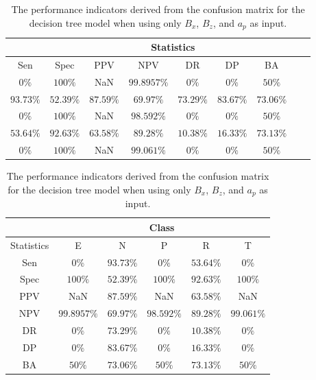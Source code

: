 \begin{table}[!ht]
	\centering
	\begin{tabular}{|c|c|c|c|c|c|c|c|c|}
		\hline
		 & \multicolumn{7}{c|}{Statistics} \\ \hline
		Sen & Spec & PPV & NPV & DR & DP & BA \\ \hline
		$0\%$ & $100\%$ & NaN & $99.8957\%$ & $0\%$ & $0\%$ & $50\%$ \\ \hline
		$93.73\%$ & $52.39\%$ & $87.59\%$ & $69.97\%$ & $73.29\%$ & $83.67\%$ & $73.06\%$ \\ \hline
		$0\%$ & $100\%$ & NaN & $98.592\%$ & $0\%$ & $0\%$ & $50\%$ \\ \hline
		$53.64\%$ & $92.63\%$ & $63.58\%$ & $89.28\%$ & $10.38\%$ & $16.33\%$ & $73.13\%$ \\ \hline
		$0\%$ & $100\%$ & NaN & $99.061\%$ & $0\%$ & $0\%$ & $50\%$ \\ \hline
	\end{tabular}
	\caption{The performance indicators derived from the confusion matrix for the decision tree model when using only $B_{x}$, $B_{z}$, and $a_{p}$ as input.}
	\label{tab:cs:xzap:C5.0}
\end{table}

\begin{table}[!ht]
	\centering
	\begin{tabular}{|c|c|c|c|c|c|}
		\hline
		 & \multicolumn{5}{c|}{Class} \\ \hline
		Statistics & E & N & P & R & T \\ \hline
		Sen & $0\%$ & $93.73\%$ & $0\%$ & $53.64\%$ & $0\%$ \\ \hline
		Spec & $100\%$ & $52.39\%$ & $100\%$ & $92.63\%$ & $100\%$ \\ \hline
		PPV & NaN & $87.59\%$ & NaN & $63.58\%$ & NaN \\ \hline
		NPV & $99.8957\%$ & $69.97\%$ & $98.592\%$ & $89.28\%$ & $99.061\%$ \\ \hline
		DR & $0\%$ & $73.29\%$ & $0\%$ & $10.38\%$ & $0\%$ \\ \hline
		DP & $0\%$ & $83.67\%$ & $0\%$ & $16.33\%$ & $0\%$ \\ \hline
		BA & $50\%$ & $73.06\%$ & $50\%$ & $73.13\%$ & $50\%$ \\ \hline
	\end{tabular}
	\caption{The performance indicators derived from the confusion matrix for the decision tree model when using only $B_{x}$, $B_{z}$, and $a_{p}$ as input.}
	\label{tab:cs:reverse:xzap:C5.0}
\end{table}

